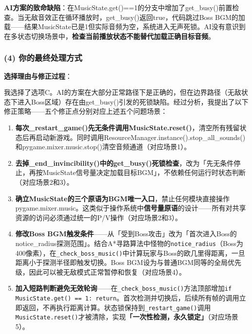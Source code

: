 \documentclass[12pt,a4paper]{ctexart}
\begin{document}
\textbf{AI方案的致命缺陷}：在MusicState.get()==1的分支中增加了get\_busy()前置检查。当无敌音效正在循环播放时，get\_busy()返回true，代码跳过Boss BGM的加载——结果MusicState已是1但实际音频为空，系统进入无声死锁。AI没有意识到在多状态切换场景中，\textbf{检查当前播放状态不能替代加载正确目标音频}。

\subsubsection{(4) 你的最终处理方式}

\begin{center}
\end{center}

\vspace{0.5cm}

\textbf{选择理由与修正过程}：

我选择了选项C。AI的方案在大部分正常路径下是正确的，但在边界路径（无敌状态下进入Boss区域）存在由get\_busy()引发的死锁缺陷。经过分析，我提出了以下修正策略——五个修正点分别对应上述五个问题场景：

\begin{enumerate}[label=(\arabic*)]
    \item \textbf{每次\_restart\_game()先无条件调用MusicState.reset()}，清空所有残留状态后再启动新游戏。同时调用ResourceManager.instance().stop\_all\_sounds()和pygame.mixer.music.stop()清空音频通道（对应场景1）。
    \item \textbf{去掉\_end\_invincibility()中的get\_busy()死锁检查}，改为「先无条件停止，再按MusicState信号量决定加载目标BGM」，不依赖任何运行时状态判断（对应场景2和3）。
    \item \textbf{确立MusicState的三个原语为BGM唯一入口}，禁止任何模块直接操作pygame.mixer.music。这类似于操作系统中\textbf{信号量原语}的设计——所有对共享资源的访问必须通过统一的P/V操作（对应场景2和3）。
    \item \textbf{修改Boss BGM触发条件}——从「受到Boss攻击」改为「首次进入Boss的notice\_radius探测范围」。结合A*寻路算法中怪物的\texttt{notice\_radius}（Boss为400像素），在\texttt{\_check\_boss\_music()}中计算玩家与Boss的欧几里得距离，一旦距离小于探测半径即触发切换。Boss BGM设为与普通BGM同等的全局优先级，因此可以被无敌模式正常暂停和恢复（对应场景4）。
    \item \textbf{加入短路判断避免无效轮询}——在\texttt{\_check\_boss\_music()}方法顶部增加\texttt{if MusicState.get() == 1: return}。首次检测并切换后，后续所有帧的调用立即返回，不再执行距离计算。状态锁保持到\texttt{\_restart\_game()}调用\texttt{MusicState.reset()}才被清除，实现\textbf{「一次性检测，永久锁定」}（对应场景5）。
\end{enumerate}
\end{document}
